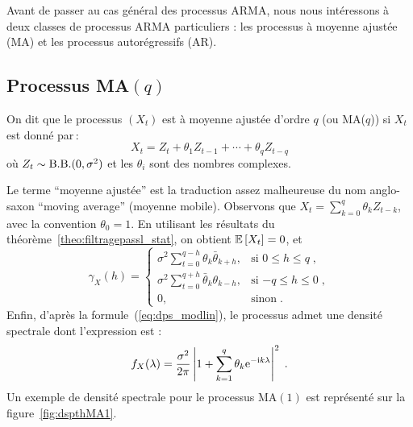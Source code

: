 Avant de passer au cas g\'en\'eral des processus ARMA, nous nous
int\'eressons \`a deux classes de processus ARMA particuliers :
les processus \`a moyenne ajust\'ee (MA) et les processus autor\'egressifs (AR).

\subsection{Processus MA$(q)$}
\begin{definition}[Processus MA($q$)]
On dit que le processus $(X_t)$ est \`a moyenne ajust\'ee d'ordre $q$ (ou MA($q$)) si $X_t$ est donn\'e par\,:
\begin{equation}
 \label{eq:recurrenceMAq}
 X_t= Z_t + \theta_1 Z_{t-1} + \cdots + \theta_q Z_{t-q}
\end{equation}
o\`u $Z_t \sim \mathrm{B.B.}(0,\sigma^2)$ et les $\theta_i$ sont des nombres complexes.
\end{definition}
Le terme ``moyenne ajust\'ee'' est la traduction assez malheureuse
du nom anglo-saxon ``moving average'' (moyenne mobile). Observons
que $X_t=\sum_{k=0}^q \theta_k Z_{t-k}$, avec la convention $\theta_0=1$.
En utilisant les r\'esultats du th\'eor\`eme~\ref{theo:filtragepassl_stat}, on obtient ${\mathbb E}\left[ X_t \right]=
0$, et
\begin{equation}
\label{eq:autocovariance-MA}
\gamma_X(h)=
\begin{cases}
\sigma^2 \sum_{t=0}^{q-h} \theta_k \bar{\theta}_{k+h}, & \text{si $0
  \leq h \leq q$}\;,\\
\sigma^2 \sum_{t=0}^{q+h} \bar{\theta}_k \theta_{k-h}, & \text{si $-q
  \leq h \leq 0$}\;,\\
 0, &\text{sinon}\;.
\end{cases}
\end{equation}
Enfin, d'apr\`es la formule~(\ref{eq:dps_modlin}), le processus
admet une densit\'e spectrale dont l'expression est :
$$
 f_X(\lambda)=\frac{\sigma^2}{2\pi}
     \left |1 + \sum_{k=1}^q \theta_k \mathrm{e}^{-\mathrm{i} k\lambda} \right
     |^2\; .
$$
Un exemple de densit\'e spectrale pour le processus MA$(1)$ est
repr\'esent\'e sur la figure~\ref{fig:dspthMA1}.
